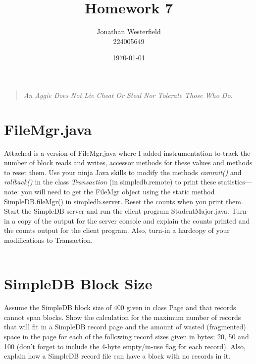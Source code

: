 \documentclass [letter,12pt] {article}
\begin{document}
\title{
    \huge{Homework 7}
}
\author{
    Jonathan Westerfield \\
    224005649
}
\date{\today}
\maketitle

\begin{quote}
\centering
\textit {
    An Aggie Does Not Lie Cheat Or Steal Nor Tolerate Those Who Do. \\
}
\vspace {1.4in}
\hrulefill
\end{quote}
\newpage

\section{FileMgr.java}
    Attached is a version of FileMgr.java where I added instrumentation 
    to track the number of block reads and writes, accessor methods for 
    these values and methods to reset them. Use your ninja Java skills 
    to modify the methods \textit{commit()} and \textit{rollback()} in 
    the class \textit{Transaction} 
    (in simpledb.remote) to print these statistics—note: you will need to 
    get the FileMgr object using the static method SimpleDB.fileMgr() in
    simpledb.server. Reset the counts when you print them. Start the 
    SimpleDB server and run the client program StudentMajor.java. Turn-in
    a copy of the output for the server console and explain the counts 
    printed and the counts output for the client program. Also, turn-in a 
    hardcopy of your modifications to Transaction.
    \\
    \\

\section{SimpleDB Block Size}
    Assume the SimpleDB block size of 400 given in class Page and that records
    cannot span blocks. Show the calculation for the maximum number of records
    that will fit in a SimpleDB record page and the amount of wasted 
    (fragmented) space in the page for each of the following record sizes
    given in bytes: 20, 50 and 100 (don’t forget to include the 4-byte 
    empty/in-use flag for each record). Also, explain how a SimpleDB record 
    file can have a block with no records in it.
    \\
    \\
\end{document}
